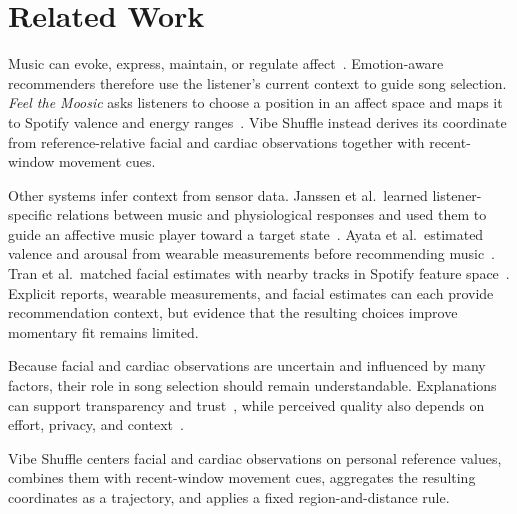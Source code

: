\section{Related Work}

Music can evoke, express, maintain, or regulate affect~\cite{juslin2008}.
Emotion-aware recommenders therefore use the listener's current context to
guide song selection. \emph{Feel the Moosic} asks listeners to choose a
position in an affect space and maps it to Spotify valence and energy
ranges~\cite{helmholz2019}. Vibe Shuffle instead derives its coordinate from
reference-relative facial and cardiac observations together with recent-window
movement cues.

Other systems infer context from sensor data. Janssen et al.\ learned
listener-specific relations between music and physiological responses and used
them to guide an affective music player toward a target
state~\cite{janssen2012}. Ayata et al.\ estimated valence and arousal from
wearable measurements before recommending music~\cite{ayata2018}. Tran et al.\
matched facial estimates with nearby tracks in Spotify feature
space~\cite{tran2023}. Explicit reports, wearable measurements, and facial
estimates can each provide recommendation context, but evidence that the
resulting choices improve momentary fit remains limited.

Because facial and cardiac observations are uncertain and influenced by many
factors, their role in song selection should remain understandable.
Explanations can support transparency and trust~\cite{nunes2017}, while
perceived quality also depends on effort, privacy, and
context~\cite{knijnenburg2012}.

Vibe Shuffle centers facial and cardiac observations on personal reference
values, combines them with recent-window movement cues, aggregates the resulting
coordinates as a trajectory, and applies a fixed region-and-distance rule.
